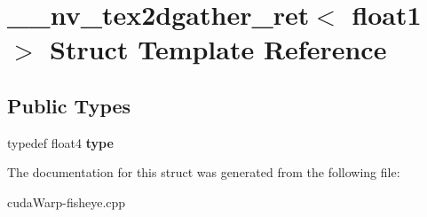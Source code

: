 \hypertarget{struct____nv__tex2dgather__ret_3_01float1_01_4}{}\section{\+\_\+\+\_\+nv\+\_\+tex2dgather\+\_\+ret$<$ float1 $>$ Struct Template Reference}
\label{struct____nv__tex2dgather__ret_3_01float1_01_4}
\subsection*{Public Types}
\begin{DoxyCompactItemize}
\item 
typedef float4 {\bfseries type}\hypertarget{struct____nv__tex2dgather__ret_3_01float1_01_4_aabedd658842901c1c276152c8652c5fd}{}\label{struct____nv__tex2dgather__ret_3_01float1_01_4_aabedd658842901c1c276152c8652c5fd}

\end{DoxyCompactItemize}


The documentation for this struct was generated from the following file\+:\begin{DoxyCompactItemize}
\item 
cuda\+Warp-\/fisheye.\+cpp\end{DoxyCompactItemize}
